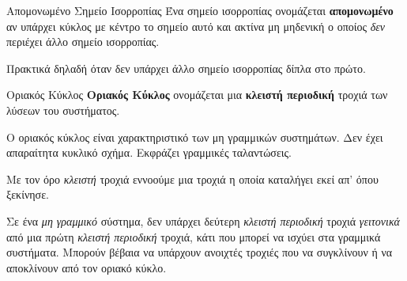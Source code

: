 \documentclass[11pt,a4paper,notitlepage,fleqn]{article}
\begin{document}
\begin{defn}{Απομονωμένο Σημείο Ισορροπίας}{}
	Ένα σημείο ισορροπίας ονομάζεται \textbf{απομονωμένο} αν υπάρχει κύκλος
	με κέντρο το σημείο αυτό και ακτίνα μη μηδενική ο οποίος \textit{δεν} περιέχει άλλο
	σημείο ισορροπίας.

	Πρακτικά δηλαδή όταν δεν υπάρχει άλλο σημείο ισορροπίας δίπλα στο πρώτο.
\end{defn}

\begin{defn}{Οριακός Κύκλος}{}
	\textbf{Οριακός Κύκλος} ονομάζεται μια \textbf{κλειστή περιοδική} τροχιά των λύσεων του
	συστήματος.

	Ο οριακός κύκλος είναι χαρακτηριστικό των μη γραμμικών συστημάτων. Δεν έχει απαραίτητα
	κυκλικό σχήμα. Εκφράζει γραμμικές ταλαντώσεις.
\end{defn}

Με τον όρο \textit{κλειστή} τροχιά εννοούμε μια τροχιά η οποία καταλήγει
εκεί απ' όπου ξεκίνησε.

Σε ένα \textit{μη γραμμικό} σύστημα, δεν υπάρχει δεύτερη \textit{κλειστή περιοδική} τροχιά
\textit{γειτονικά} από μια πρώτη \textit{κλειστή περιοδική} τροχιά, κάτι που μπορεί να ισχύει
στα γραμμικά συστήματα. Μπορούν βέβαια να υπάρχουν ανοιχτές τροχιές που να συγκλίνουν ή να
αποκλίνουν από τον οριακό κύκλο.

\begin{center}
\end{center}
\end{document}
